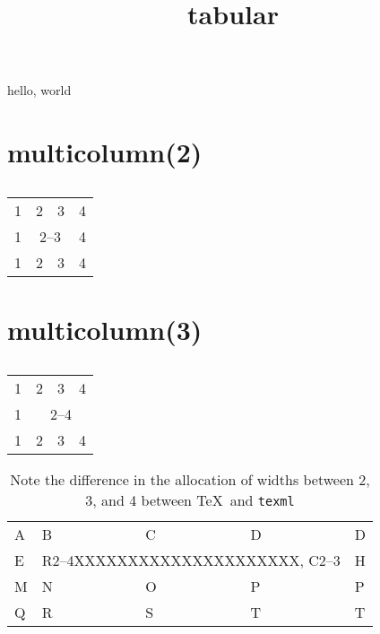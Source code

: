 \documentclass{amsart}
\title{tabular}
\begin{document}
\maketitle

hello, world

\section*{multicolumn(2)}

\begin{table}[H]
\caption{}
\begin{tabular}{|c|c|c|c|}
    1 & 2 & 3                    & 4\\
    1 & \multicolumn{2}{c|}{2--3} & 4\\
    1 & 2 & 3                    & 4
\end{tabular}
\end{table}

\section*{multicolumn(3)}

\begin{table}[H]
\caption{}
\begin{tabular}{|c|c|c|c|}
    1 & 2 & 3 & 4\\
    1 & \multicolumn{3}{c|}{2--4}\\
    1 & 2 & 3 & 4
\end{tabular}
\end{table}

\begin{table}[H]
\caption{Note the difference in the allocation of widths between 2, 3,
and 4 between \TeX\ and \texttt{texml}}
\begin{tabular}{|l|l|l|l|l|}
A &   B & C                & D & D\\
E &   \multicolumn{3}{c}{R2--4XXXXXXXXXXXXXXXXXXXXX, C2--3} &H\\
M &   N & O                & P & P\\
Q &   R & S                & T & T
\end{tabular}
\end{table}
\end{document}
